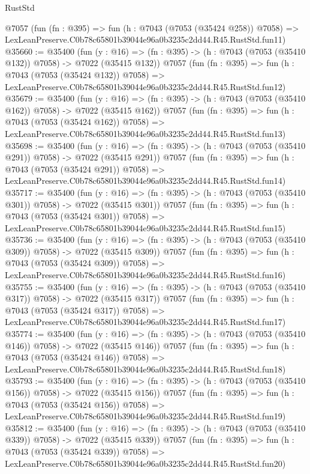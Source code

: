 \begin{lexlean}{RustStd}
\begin{coremodule}
    @7057
    (fun (fn : @395) =>
    fun (h : @7043 (@7053 (@35424 @258)) @7058) =>
    LexLeanPreserve.C0b78c65801b39044e96a0b3235c2dd44.R45.RustStd.fun11)
@35660 := @35400
    (fun (y : @16) => (fn : @395) -> (h : @7043 (@7053 (@35410 @132)) @7058) -> @7022 (@35415 @132))
    @7057
    (fun (fn : @395) =>
    fun (h : @7043 (@7053 (@35424 @132)) @7058) =>
    LexLeanPreserve.C0b78c65801b39044e96a0b3235c2dd44.R45.RustStd.fun12)
@35679 := @35400
    (fun (y : @16) => (fn : @395) -> (h : @7043 (@7053 (@35410 @162)) @7058) -> @7022 (@35415 @162))
    @7057
    (fun (fn : @395) =>
    fun (h : @7043 (@7053 (@35424 @162)) @7058) =>
    LexLeanPreserve.C0b78c65801b39044e96a0b3235c2dd44.R45.RustStd.fun13)
@35698 := @35400
    (fun (y : @16) => (fn : @395) -> (h : @7043 (@7053 (@35410 @291)) @7058) -> @7022 (@35415 @291))
    @7057
    (fun (fn : @395) =>
    fun (h : @7043 (@7053 (@35424 @291)) @7058) =>
    LexLeanPreserve.C0b78c65801b39044e96a0b3235c2dd44.R45.RustStd.fun14)
@35717 := @35400
    (fun (y : @16) => (fn : @395) -> (h : @7043 (@7053 (@35410 @301)) @7058) -> @7022 (@35415 @301))
    @7057
    (fun (fn : @395) =>
    fun (h : @7043 (@7053 (@35424 @301)) @7058) =>
    LexLeanPreserve.C0b78c65801b39044e96a0b3235c2dd44.R45.RustStd.fun15)
@35736 := @35400
    (fun (y : @16) => (fn : @395) -> (h : @7043 (@7053 (@35410 @309)) @7058) -> @7022 (@35415 @309))
    @7057
    (fun (fn : @395) =>
    fun (h : @7043 (@7053 (@35424 @309)) @7058) =>
    LexLeanPreserve.C0b78c65801b39044e96a0b3235c2dd44.R45.RustStd.fun16)
@35755 := @35400
    (fun (y : @16) => (fn : @395) -> (h : @7043 (@7053 (@35410 @317)) @7058) -> @7022 (@35415 @317))
    @7057
    (fun (fn : @395) =>
    fun (h : @7043 (@7053 (@35424 @317)) @7058) =>
    LexLeanPreserve.C0b78c65801b39044e96a0b3235c2dd44.R45.RustStd.fun17)
@35774 := @35400
    (fun (y : @16) => (fn : @395) -> (h : @7043 (@7053 (@35410 @146)) @7058) -> @7022 (@35415 @146))
    @7057
    (fun (fn : @395) =>
    fun (h : @7043 (@7053 (@35424 @146)) @7058) =>
    LexLeanPreserve.C0b78c65801b39044e96a0b3235c2dd44.R45.RustStd.fun18)
@35793 := @35400
    (fun (y : @16) => (fn : @395) -> (h : @7043 (@7053 (@35410 @156)) @7058) -> @7022 (@35415 @156))
    @7057
    (fun (fn : @395) =>
    fun (h : @7043 (@7053 (@35424 @156)) @7058) =>
    LexLeanPreserve.C0b78c65801b39044e96a0b3235c2dd44.R45.RustStd.fun19)
@35812 := @35400
    (fun (y : @16) => (fn : @395) -> (h : @7043 (@7053 (@35410 @339)) @7058) -> @7022 (@35415 @339))
    @7057
    (fun (fn : @395) =>
    fun (h : @7043 (@7053 (@35424 @339)) @7058) =>
    LexLeanPreserve.C0b78c65801b39044e96a0b3235c2dd44.R45.RustStd.fun20)

\end{coremodule}
\end{lexlean}
